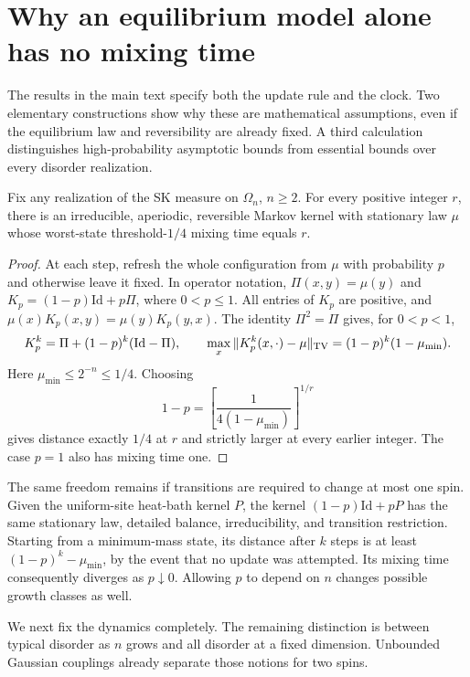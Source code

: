 \section{Why an equilibrium model alone has no mixing time}\label{sec:specification}
The results in the main text specify both the update rule and the
clock. Two elementary constructions show why these are mathematical
assumptions, even if the equilibrium law and reversibility are already
fixed. A third calculation distinguishes high-probability asymptotic
bounds from essential bounds over every disorder realization.

\begin{proposition}\label{prop:arbitrary-refresh}
Fix any realization of the SK measure on $\Omega_n$, $n\ge2$. For every positive integer $r$, there is an irreducible, aperiodic, reversible Markov kernel with stationary law $\mu$ whose worst-state threshold-$1/4$ mixing time equals $r$.
\end{proposition}
\begin{proof}
At each step, refresh the whole configuration from $\mu$ with
probability $p$ and otherwise leave it fixed. In operator notation,
$\Pi(x,y)=\mu(y)$ and $K_p=(1-p)\mathrm{Id}+p\Pi$, where $0<p\le1$.
All entries of $K_p$ are positive, and
$\mu(x)K_p(x,y)=\mu(y)K_p(y,x)$. The identity $\Pi^2=\Pi$ gives,
for $0<p<1$,
\[
 K_p^k=\Pi+(1-p)^k(\mathrm{Id}-\Pi),\qquad
 \max_x\|K_p^k(x,\cdot)-\mu\|_{\mathrm{TV}}
 =(1-p)^k(1-\mu_{\min}).
\]
Here $\mu_{\min}\le2^{-n}\le1/4$. Choosing
\[
 1-p=\left[\frac{1}{4(1-\mu_{\min})}\right]^{1/r}
\]
gives distance exactly $1/4$ at $r$ and strictly larger at every earlier integer. The case $p=1$ also has mixing time one.
\end{proof}

The same freedom remains if transitions are required to change at
most one spin. Given the uniform-site heat-bath kernel $P$, the kernel $(1-p)\mathrm{Id}+pP$ has the same stationary law, detailed balance, irreducibility, and transition restriction. Starting from a minimum-mass state, its distance after $k$ steps is at least $(1-p)^k-\mu_{\min}$, by the event that no update was attempted. Its mixing time consequently diverges as $p\downarrow0$. Allowing $p$ to depend on $n$ changes possible growth classes as well.

We next fix the dynamics completely. The remaining distinction is
between typical disorder as $n$ grows and all disorder at a fixed
dimension. Unbounded Gaussian couplings already separate those notions
for two spins.

